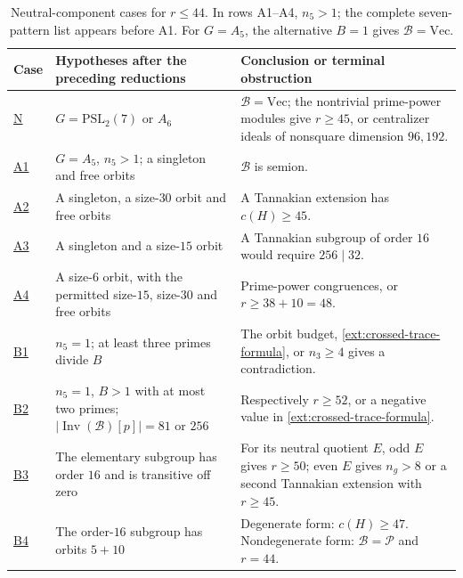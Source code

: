 \documentclass[11pt]{amsart}
\numberwithin{equation}{section}
\theoremstyle{definition}
\theoremstyle{plain}
\begin{document}
\begin{table}[htbp]
\centering\footnotesize\setlength{\tabcolsep}{4pt}
\begin{tabular}{@{}p{.07\linewidth}p{.40\linewidth}p{.47\linewidth}@{}}
\toprule
Case & Hypotheses after the preceding reductions & Conclusion or terminal obstruction\\
\midrule
\hyperref[ext:neutral-N]{N} & $G=\mathrm{PSL}_2(7)$ or $A_6$ &
$\mathcal B=\mathrm{Vec}$; the nontrivial prime-power modules give
$r\ge45$, or centralizer ideals of nonsquare dimension $96,192$.\\
\hyperref[ext:neutral-A1]{A1} & $G=A_5$, $n_5>1$; a singleton and free orbits &
$\mathcal B$ is semion.\\
\hyperref[ext:neutral-A2]{A2} & A singleton, a size-$30$ orbit and free orbits &
A Tannakian extension has $c(H)\ge45$.\\
\hyperref[ext:neutral-A3]{A3} & A singleton and a size-$15$ orbit &
A Tannakian subgroup of order $16$ would require $256\mid32$.\\
\hyperref[ext:neutral-A4]{A4} & A size-$6$ orbit, with the permitted size-$15$, size-$30$ and free orbits &
Prime-power congruences, or $r\ge38+10=48$.\\
\hyperref[ext:neutral-B1]{B1} & $n_5=1$; at least three primes divide $B$ &
The orbit budget, \eqref{ext:crossed-trace-formula}, or
$n_3\ge4$ gives a contradiction.\\
\hyperref[ext:neutral-B2]{B2} & $n_5=1$, $B>1$ with at most two primes;
$|\operatorname{Inv}(\mathcal B)[p]|=81$ or $256$ &
Respectively $r\ge52$, or a negative value in
\eqref{ext:crossed-trace-formula}.\\
\hyperref[ext:neutral-B3]{B3} & The elementary subgroup has order $16$ and is transitive off zero &
For its neutral quotient $E$, odd $E$ gives $r\ge50$; even $E$
gives $n_g>8$ or a second Tannakian extension with $r\ge45$.\\
\hyperref[ext:neutral-B4]{B4} & The order-$16$ subgroup has orbits $5+10$ &
Degenerate form: $c(H)\ge47$. Nondegenerate form:
$\mathcal B=\mathcal P$ and $r=44$.\\
\bottomrule
\end{tabular}
\caption{Neutral-component cases for $r\le44$. In rows A1--A4,
$n_5>1$; the complete seven-pattern list appears before A1.
For $G=A_5$, the alternative $B=1$ gives $\mathcal B=\mathrm{Vec}$.}
\label{tab:neutral-cases}
\end{table}
\end{document}
